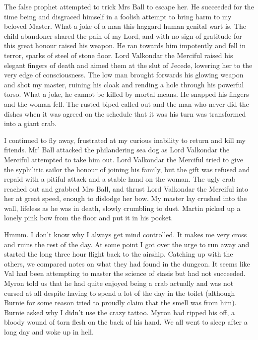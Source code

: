 The false prophet attempted to trick Mrs Ball to escape her. He succeeded for the time being and disgraced himself in a foolish attempt to bring harm to my beloved Master. What a joke of a man this haggard human genital wart is. The child abandoner shared the pain of my Lord, and with no sign of gratitude for this great honour raised his weapon. He ran towards him impotently and fell in terror, sparks of steel of stone floor. Lord Valkondar the Merciful raised his elegant fingers of death and aimed them at the slut of Jecede, lowering her to the very edge of consciousness. The low man brought forwards his glowing weapon and shot my master, ruining his cloak and rending a hole through his powerful torso. What a joke, he cannot be killed by mortal means. He snapped his fingers and the woman fell. The rusted biped called out and the man who never did the dishes when it was agreed on the schedule that it was his turn was transformed into a giant crab.\medskip

I continued to fly away, frustrated at my curious inability to return and kill my friends. Mr’ Ball attacked the philandering sea dog as Lord Valkondar the Merciful attempted to take him out. Lord Valkondar the Merciful tried to give the syphilitic sailor the honour of joining his family, but the gift was refused and repaid with a pitiful attack and a stable hand on the woman. The ugly crab reached out and grabbed Mrs Ball, and thrust Lord Valkondar the Merciful into her at great speed, enough to dislodge her bow. My master lay crushed into the wall, lifeless as he was in death, slowly crumbling to dust. Martin picked up a lonely pink bow from the floor and put it in his pocket.\medskip

Hmmm. I don’t know why I always get mind controlled. It makes me very cross and ruins the rest of the day. At some point I got over the urge to run away and started the long three hour flight back to the airship. Catching up with the others, we compared notes on what they had found in the dungeon. It seems like Val had been attempting to master the science of stasis but had not succeeded. Myron told us that he had quite enjoyed being a crab actually and was not cursed at all despite having to spend a lot of the day in the toilet (although Burnie for some reason tried to proudly claim that the smell was from him). Burnie asked why I didn’t use the crazy tattoo. Myron had ripped his off, a bloody wound of torn flesh on the back of his hand. We all went to sleep after a long day and woke up in hell.\medskip


